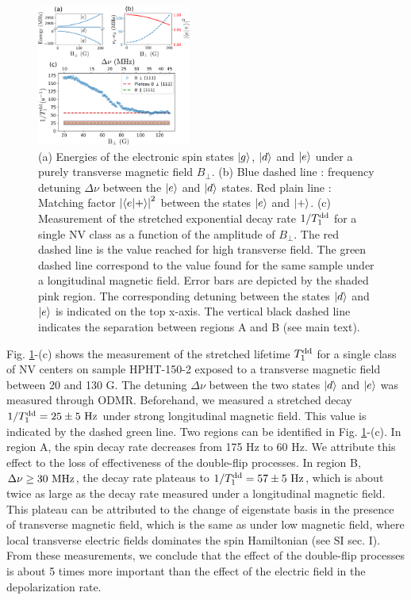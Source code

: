 \documentclass[preprintnumbers,amsmath,amssymb,superscriptaddress,twocolumn,showpacs]{revtex4-2}
\begin{document}
\begin{figure}
\includegraphics[width=0.45\textwidth]{Figures/fig_transverse_field_V2.pdf}
\caption{(a) Energies of the electronic spin states $\ket{g}$, $\ket{d}$ and $\ket{e}$ under a purely transverse magnetic field $B_\perp$. (b) Blue dashed line : frequency detuning $\Delta \nu$ between the $\ket{e}$ and $\ket{d}$ states. Red plain line : Matching factor $\abs{\bra{e}\ket{+}}^2$ between the states $\ket{e}$ and $\ket{+}$. (c) Measurement of the stretched exponential decay rate $1/T_1^{\rm dd}$ for a single NV class as a function of the amplitude of $B_\perp$. The red dashed line is the value reached for high transverse field. The green dashed line correspond to the value found for the same sample under a longitudinal magnetic field. Error bars are depicted by the shaded pink region. The corresponding detuning between the states $\ket{d}$ and $\ket{e}$ is indicated on the top x-axis. The vertical black dashed line indicates the separation between regions A and B (see main text).}
\label{B_transverse}
\end{figure}

Fig. \ref{B_transverse}-(c) shows the measurement of the stretched lifetime $T_1^{\rm dd}$ for a single class of NV centers on sample HPHT-150-2 exposed to a transverse magnetic field between 20 and 130 G.  The detuning $\Delta \nu$ between the two states $\ket{d}$ and $\ket{e}$ was measured through ODMR. Beforehand, we measured a stretched decay $1/T_1^{\rm dd}=25\pm 5\  \rm Hz$ under strong longitudinal magnetic field. This value is indicated by the dashed green line. Two regions can be identified in Fig. \ref{B_transverse}-(c). In  region A, the spin decay rate decreases from 175 Hz to 60 Hz.  We attribute this effect to the loss of effectiveness of the double-flip processes. In region B, $\Delta \nu \geq 30\ \rm MHz$, the decay rate plateaus to $1/T_1^{\rm dd}=57\pm 5\  \rm Hz$, which is about twice as large as the decay rate measured under a longitudinal magnetic field. This plateau can be attributed to the change of eigenstate basis in the presence of transverse magnetic field, which is the same as under low magnetic field, where local transverse electric fields dominates the spin Hamiltonian (see SI sec. I). From these measurements, we conclude that the effect of the double-flip processes is about 5 times more important than the effect of the electric field in the depolarization rate.
\end{document}
